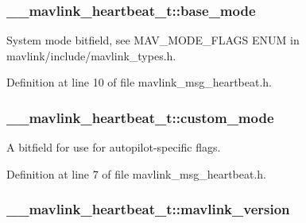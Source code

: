\hypertarget{struct____mavlink__heartbeat__t_a816ec38dcbb0f4948185efbdd96ebb5e}{
\subsubsection[{base\-\_\-mode}]{ \-\_\-\-\_\-mavlink\-\_\-heartbeat\-\_\-t\-::base\-\_\-mode}}\label{struct____mavlink__heartbeat__t_a816ec38dcbb0f4948185efbdd96ebb5e}


System mode bitfield, see M\-A\-V\-\_\-\-M\-O\-D\-E\-\_\-\-F\-L\-A\-G\-S E\-N\-U\-M in mavlink/include/mavlink\-\_\-types.\-h. 



Definition at line 10 of file mavlink\-\_\-msg\-\_\-heartbeat.\-h.

\hypertarget{struct____mavlink__heartbeat__t_a4d8e5d4a59f775887eaecfd58303e17d}{
\subsubsection[{custom\-\_\-mode}]{ \-\_\-\-\_\-mavlink\-\_\-heartbeat\-\_\-t\-::custom\-\_\-mode}}\label{struct____mavlink__heartbeat__t_a4d8e5d4a59f775887eaecfd58303e17d}


A bitfield for use for autopilot-\/specific flags. 



Definition at line 7 of file mavlink\-\_\-msg\-\_\-heartbeat.\-h.

\hypertarget{struct____mavlink__heartbeat__t_a235d5b6a09fa9b24b3ef7b7a28d15b97}{
\subsubsection[{mavlink\-\_\-version}]{ \-\_\-\-\_\-mavlink\-\_\-heartbeat\-\_\-t\-::mavlink\-\_\-version}}\label{struct____mavlink__heartbeat__t_a235d5b6a09fa9b24b3ef7b7a28d15b97}



